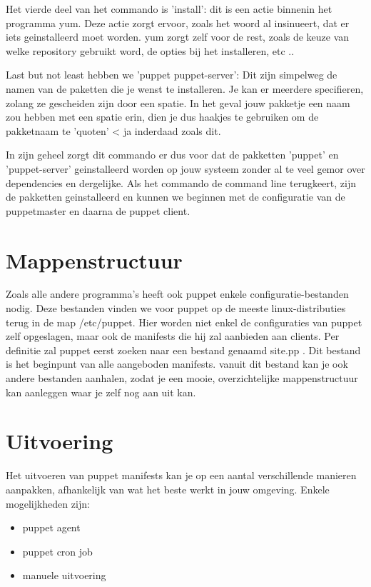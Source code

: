 Het vierde deel van het commando is 'install': dit is een actie binnenin het programma yum. Deze actie zorgt ervoor, zoals het woord al insinueert, dat er iets geinstalleerd moet worden. yum zorgt zelf voor de rest, zoals de keuze van welke repository gebruikt word, de opties bij het installeren, etc ..

Last but not least hebben we 'puppet puppet-server': Dit zijn simpelweg de namen van de paketten die je wenst te installeren. Je kan er meerdere specifieren, zolang ze gescheiden zijn door een spatie. In het geval jouw pakketje een naam zou hebben met een spatie erin, dien je dus haakjes te gebruiken om de pakketnaam te 'quoten' < ja inderdaad zoals dit.

In zijn geheel zorgt dit commando er dus voor dat de pakketten 'puppet' en 'puppet-server' geinstalleerd worden op jouw systeem zonder al te veel gemor over dependencies en dergelijke. Als het commando de command line terugkeert, zijn de pakketten geinstalleerd en kunnen we beginnen met de configuratie van de puppetmaster en daarna de puppet client.



\section{Mappenstructuur}
Zoals alle andere programma's heeft ook puppet enkele configuratie-bestanden nodig. Deze bestanden vinden we voor puppet op de meeste linux-distributies terug in de map /etc/puppet. Hier worden niet enkel de configuraties van puppet zelf opgeslagen, maar ook de manifests die hij zal aanbieden aan clients. Per definitie zal puppet eerst zoeken naar een bestand genaamd site.pp . Dit bestand is het beginpunt van alle aangeboden manifests. vanuit dit bestand kan je ook andere bestanden aanhalen, zodat je een mooie, overzichtelijke mappenstructuur kan aanleggen waar je zelf nog aan uit kan.

\section{Uitvoering}
Het uitvoeren van puppet manifests kan je op een aantal verschillende manieren aanpakken, afhankelijk van wat het beste werkt in jouw omgeving. Enkele mogelijkheden zijn:
\begin{itemize}
\item puppet agent
\item puppet cron job
\item manuele uitvoering
\end{itemize}
